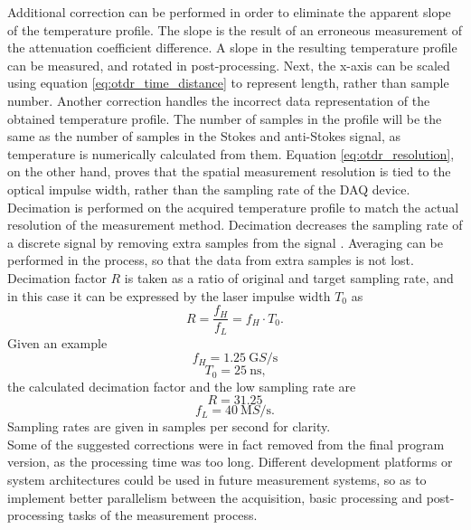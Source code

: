 \documentclass{standalone}
\begin{document}
Additional correction can be performed in order to eliminate the apparent slope of the temperature profile. The slope is the result of an erroneous measurement of the attenuation coefficient difference. A slope in the resulting temperature profile can be measured, and rotated in post-processing. Next, the x-axis can be scaled using equation \ref{eq:otdr_time_distance} to represent length, rather than sample number. Another correction handles the incorrect data representation of the obtained temperature profile. The number of samples in the profile will be the same as the number of samples in the Stokes and anti-Stokes signal, as temperature is numerically calculated from them. Equation \ref{eq:otdr_resolution}, on the other hand, proves that the spatial measurement resolution is tied to the optical impulse width, rather than the sampling rate of the DAQ device. Decimation is performed on the acquired temperature profile to match the actual resolution of the measurement method. Decimation decreases the sampling rate of a discrete signal by removing extra samples from the signal \cite{fer:dos}. Averaging can be performed in the process, so that the data from extra samples is not lost. Decimation factor $R$ is taken as a ratio of original and target sampling rate, and in this case it can be expressed by the laser impulse width $T_0$ as
\begin{equation}
R = \frac{f_H}{f_L} = f_H \cdot T_0 \textrm{.}
\end{equation}
Given an example
\begin{equation}
f_H = \SI{1.25}{\giga S / \second}
\end{equation}
\begin{equation}
T_0 = \SI{25}{\nano \second} \textrm{,}
\end{equation}
the calculated decimation factor and the low sampling rate are
\begin{equation}
R = 31.25
\end{equation}
\begin{equation}
f_L = \SI{40}{\mega S / \second} \textrm{.}
\end{equation}
Sampling rates are given in samples per second for clarity. \\

Some of the suggested corrections were in fact removed from the final program version, as the processing time was too long. Different development platforms or system architectures could be used in future measurement systems, so as to implement better parallelism between the acquisition, basic processing and post-processing tasks of the measurement process.
\end{document}
